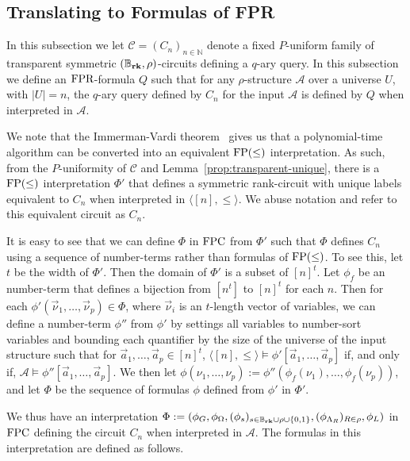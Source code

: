 \documentclass[../paper.tex]{subfiles}
\begin{document}
\subsection{Translating to Formulas of FPR}
\label{sec:translating-formulas-to-FPR}
In this subsection we let $\mathcal{C} = (C_n)_{n \in \mathbb{N}}$ denote a
fixed $P$-uniform family of transparent symmetric $(\mathbb{B}_{\text{\textbf{rk}}}, \rho)$-circuits
defining a $q$-ary query. In this subsection we define an $\text{\upshape FPR}$-formula $Q$
such that for any $\rho$-structure $\mathcal{A}$ over a universe $U$, with
$\vert U \vert = n$, the $q$-ary query defined by $C_n$ for the input
$\mathcal{A}$ is defined by $Q$ when interpreted in $\mathcal{A}$.

We note that the Immerman-Vardi theorem~\cite{Immerman198686, Vardi:1982} gives
us that a polynomial-time algorithm can be converted into an equivalent $\text{\upshape FP}(\leq)$
interpretation. As such, from the $P$-uniformity of $\mathcal{C}$ and
Lemma~\ref{prop:transparent-unique}, there is a $\text{\upshape FP}(\leq)$ interpretation
$\Phi'$ that defines a symmetric rank-circuit with unique labels equivalent
to $C_n$ when interpreted in $\langle [n], \leq \rangle$. We abuse notation and
refer to this equivalent circuit as $C_n$.

It is easy to see that we can define $\Phi$ in $\text{\upshape FPC}$ from $\Phi'$ such that
$\Phi$ defines $C_n$ using a sequence of number-terms rather than formulas of
$\text{\upshape FP}(\leq)$. To see this, let $t$ be the width of $\Phi'$. Then the domain of
$\Phi'$ is a subset of $[n]^t$. Let $\phi_f$ be an number-term that defines a
bijection from $[n^t]$ to $[n]^t$ for each $n$. Then for each $\phi'
(\vec{\nu}_1, \ldots, \vec{\nu}_{p}) \in \Phi$, where $\vec{\nu}_i$ is an
$t$-length vector of variables, we can define a number-term $\phi''$ from
$\phi'$ by settings all variables to number-sort variables and bounding each
quantifier by the size of the universe of the input structure such that for
$\vec{a}_1, \ldots, \vec{a}_p \in [n]^t$, $\langle [n], \leq \rangle \models
\phi' [\vec{a}_1, \ldots, \vec{a}_p]$ if, and only if, $\mathcal{A} \models
\phi'' [\vec{a}_1, \ldots, \vec{a}_p]$. We then let $\phi(\nu_1, \ldots, \nu_p)
:= \phi''(\phi_f (\nu_1), \ldots, \phi_f(\nu_p))$, and let $\Phi$ be the
sequence of formulas $\phi$ defined from $\phi'$ in $\Phi'$.

We thus have an interpretation $\Phi := (\phi_G, \phi_\Omega, (\phi_s)_{ s \in
  \mathbb{B}_{\text{\textbf{rk}}} \cup \rho \cup \{0,1\}}, (\phi_{\Lambda_R})_{R \in \rho}, \phi_L)$ in
$\text{\upshape FPC}$ defining the circuit $C_n$ when interpreted in $\mathcal{A}$. The
formulas in this interpretation are defined as follows.
\end{document}
